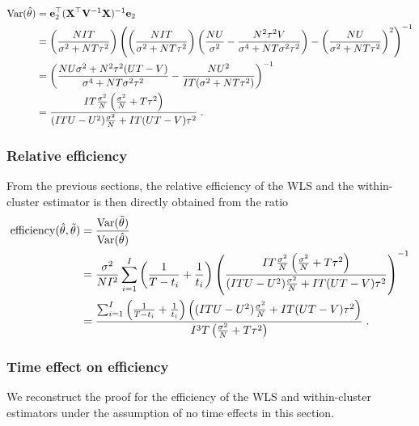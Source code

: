 \documentclass[10pt]{article}
\begin{document}
\begin{align*}
\mathrm{Var}(\hat{\theta}) &= \mathbf{e}_2^\top(\mathbf{X}^\top\mathbf{V}^{-1}\mathbf{X})^{-1}\mathbf{e}_2 \\
&= \left(\frac{NIT}{\sigma^2+NT\tau^2}\right)\left(\left(\frac{NIT}{\sigma^2+NT\tau^2}\right)\left(\frac{NU}{\sigma^2} - \frac{N^2\tau^2V}{\sigma^4+NT\sigma^2\tau^2}\right)-\left(\frac{NU}{\sigma^2+NT\tau^2}\right)^2\right)^{-1} \\
&= \left(\frac{NU\sigma^2+N^2\tau^2(UT-V)}{\sigma^4+NT\sigma^2\tau^2}-\frac{NU^2}{IT(\sigma^2+NT\tau^2)}\right)^{-1} \\
&= \frac{IT\frac{\sigma^2}{N}\left(\frac{\sigma^2}{N}+T\tau^2\right)}{(ITU-U^2)\frac{\sigma^2}{N}+IT(UT-V)\tau^2} \;.
\end{align*}

\subsubsection{Relative efficiency}

From the previous sections, the relative efficiency of the WLS and the within-cluster estimator is then directly obtained from the ratio
\begin{align*}
\mathrm{efficiency}(\hat{\theta},\tilde{\theta}) &= \frac{\mathrm{Var}(\tilde{\theta})}{\mathrm{Var}(\hat{\theta})} \\
&= \frac{\sigma^2}{NI^2}\sum_{i=1}^I\left(\frac{1}{T-t_i} + \frac{1}{t_i}\right)\left(\frac{IT\frac{\sigma^2}{N}\left(\frac{\sigma^2}{N}+T\tau^2\right)}{(ITU-U^2)\frac{\sigma^2}{N}+IT(UT-V)\tau^2}\right)^{-1} \\
&= \frac{\sum_{i=1}^I\left(\frac{1}{T-t_i} + \frac{1}{t_i}\right)\left((ITU-U^2)\frac{\sigma^2}{N}+IT(UT-V)\tau^2\right)}{I^3T\left(\frac{\sigma^2}{N}+T\tau^2\right)} \;.
\end{align*}

\subsubsection{Time effect on efficiency}

We reconstruct the proof for the efficiency of the WLS and within-cluster estimators under the assumption of no time effects in this section.
\end{document}
